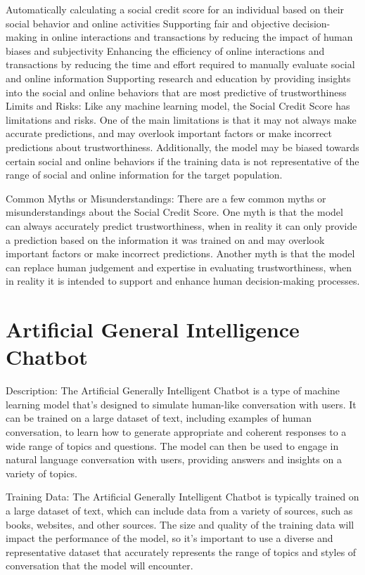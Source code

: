\begin{itemize}
{Automatically calculating a social credit score for an individual based on their social behavior and online activities
Supporting fair and objective decision-making in online interactions and transactions by reducing the impact of human biases and subjectivity
Enhancing the efficiency of online interactions and transactions by reducing the time and effort required to manually evaluate social and online information
Supporting research and education by providing insights into the social and online behaviors that are most predictive of trustworthiness
Limits and Risks:
Like any machine learning model, the Social Credit Score has limitations and risks. One of the main limitations is that it may not always make accurate predictions, and may overlook important factors or make incorrect predictions about trustworthiness. Additionally, the model may be biased towards certain social and online behaviors if the training data is not representative of the range of social and online information for the target population.

Common Myths or Misunderstandings:
There are a few common myths or misunderstandings about the Social Credit Score. One myth is that the model can always accurately predict trustworthiness, when in reality it can only provide a prediction based on the information it was trained on and may overlook important factors or make incorrect predictions. Another myth is that the model can replace human judgement and expertise in evaluating trustworthiness, when in reality it is intended to support and enhance human decision-making processes.

\section{Artificial General Intelligence Chatbot}

Description:
The Artificial Generally Intelligent Chatbot is a type of machine learning model that's designed to simulate human-like conversation with users. It can be trained on a large dataset of text, including examples of human conversation, to learn how to generate appropriate and coherent responses to a wide range of topics and questions. The model can then be used to engage in natural language conversation with users, providing answers and insights on a variety of topics.

Training Data:
The Artificial Generally Intelligent Chatbot is typically trained on a large dataset of text, which can include data from a variety of sources, such as books, websites, and other sources. The size and quality of the training data will impact the performance of the model, so it's important to use a diverse and representative dataset that accurately represents the range of topics and styles of conversation that the model will encounter.

}
\end{itemize}
